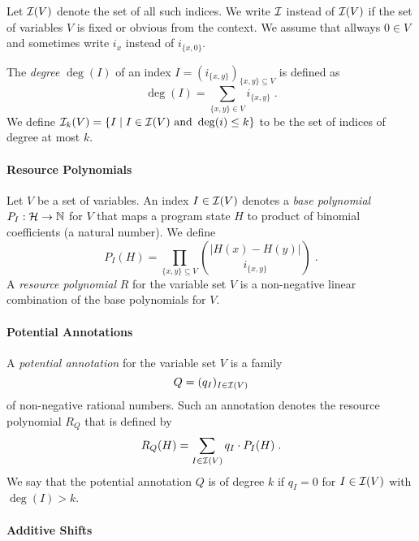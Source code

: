 \documentclass[nocopyrightspace,preprint]{sigplanconf-pldi15}
\begin{document}
Let $\mathcal{I}(V)$ denote the set of all such indices.  We write $\mathcal{I}$
instead of $\mathcal{I}(V)$ if the set of variables $V$ is fixed or obvious
from the context.
%
We assume that allways $0 \in V$ and sometimes write $i_x$ instead of $i_{\{x,0\}}$.

The \emph{degree} $\deg(I)$ of an index $I = (i_{\{x,y\}})_{\{x,y\}
  \subseteq V}$ is defined as
$$
\deg(I) = \sum_{\{x,y\} \in V} i_{\{x,y\}} \;.
$$
We define $\mathcal{I}_k(V) = \{ I \mid I \in \mathcal{I}(V) \text{ and } \deg(i) \leq k
\}$ to be the set of indices of degree at most $k$.

\paragraph{Resource Polynomials}

Let $V$ be a set of variables.  An index $I \in \mathcal{I}(V)$ denotes a
\emph{base polynomial} $P_I : \mathcal{H} \to \mathbb{N}$ for $V$ that maps a
program state $H$ to product of binomial coefficients (a natural
number).  We define
$$
P_I(H) = \prod_{{\{x,y\}} \subseteq V} \binom {|H(x){-}H(y)|} {i_{\{x,y\}}} \; .
$$
%
A \emph{resource polynomial} $R$ for the variable set $V$ is a
non-negative linear combination of the base polynomials for $V$.

\paragraph{Potential Annotations}

A \emph{potential annotation} for the variable set $V$ is a family
$$Q = (q_I)_{I \in \mathcal{I}(V)}$$
of non-negative rational numbers.  Such an annotation denotes the
resource polynomial $R_Q$ that is defined by
$$
R_Q(H) = \sum_{I \in \mathcal{I}(V)} q_I \cdot P_I(H) \; .
$$
%
We say that the potential annotation $Q$ is of degree $k$ if $q_I = 0$
for $I \in \mathcal{I}(V)$ with $\deg(I) > k$.

\paragraph{Additive Shifts}
\end{document}

